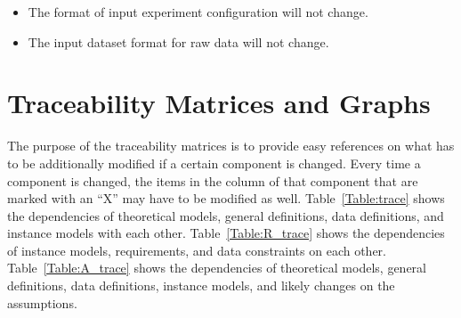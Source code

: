 \documentclass[12pt]{article}
\newcounter{lcnum} %
\begin{document}
\noindent \begin{itemize}

\item[LC\refstepcounter{lcnum}\thelcnum\label{LC_meaningfulLabel}:] The format of input experiment configuration will not change.

\item[LC\refstepcounter{lcnum}\thelcnum\label{LC_meaningfulLabel}:] The input dataset format for raw data will not change.

\end{itemize}

\section{Traceability Matrices and Graphs}

The purpose of the traceability matrices is to provide easy references on what
has to be additionally modified if a certain component is changed.  Every time a
component is changed, the items in the column of that component that are marked
with an ``X'' may have to be modified as well.  Table~\ref{Table:trace} shows the
dependencies of theoretical models, general definitions, data definitions, and
instance models with each other. Table~\ref{Table:R_trace} shows the
dependencies of instance models, requirements, and data constraints on each
other. Table~\ref{Table:A_trace} shows the dependencies of theoretical models,
general definitions, data definitions, instance models, and likely changes on
the assumptions.
\end{document}

